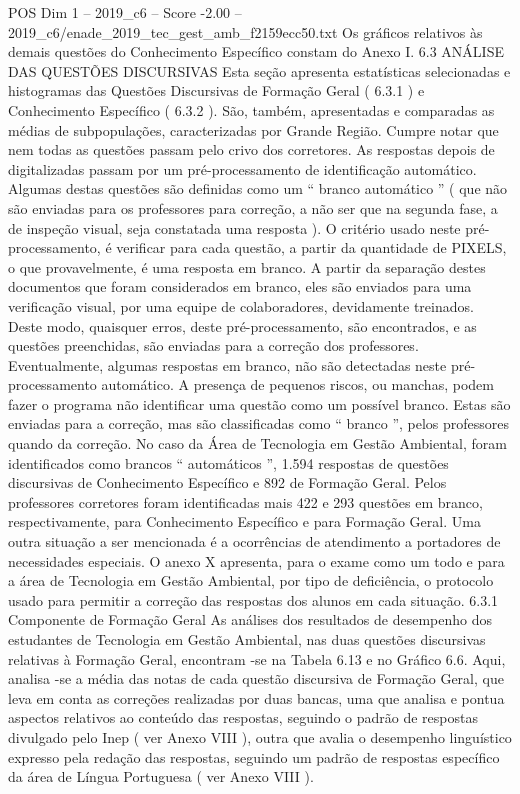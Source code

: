 \begin{textsample}{POS Dim 1 – 2019\_c6 – Score -2.00 – 2019\_c6/enade\_2019\_tec\_gest\_amb\_f2159ecc50.txt}
Os gráficos relativos às demais questões do Conhecimento Específico constam do Anexo I. 6.3 ANÁLISE DAS QUESTÕES DISCURSIVAS Esta seção apresenta estatísticas selecionadas e histogramas das Questões Discursivas de Formação Geral ( 6.3.1 ) e Conhecimento Específico ( 6.3.2 ).
São, também, apresentadas e comparadas as médias de subpopulações, caracterizadas por Grande Região.
Cumpre notar que nem todas as questões passam pelo crivo dos corretores.
As respostas depois de digitalizadas passam por um pré-processamento de identificação automático.
Algumas destas questões são definidas como um “ branco automático ” ( que não são enviadas para os professores para correção, a não ser que na segunda fase, a de inspeção visual, seja constatada uma resposta ).
O critério usado neste pré-processamento, é verificar para cada questão, a partir da quantidade de PIXELS, o que provavelmente, é uma resposta em branco.
A partir da separação destes documentos que foram considerados em branco, eles são enviados para uma verificação visual, por uma equipe de colaboradores, devidamente treinados.
Deste modo, quaisquer erros, deste pré-processamento, são encontrados, e as questões preenchidas, são enviadas para a correção dos professores.
Eventualmente, algumas respostas em branco, não são detectadas neste pré-processamento automático.
A presença de pequenos riscos, ou manchas, podem fazer o programa não identificar uma questão como um possível branco.
Estas são enviadas para a correção, mas são classificadas como “ branco ”, pelos professores quando da correção.
No caso da Área de Tecnologia em Gestão Ambiental, foram identificados como brancos “ automáticos ”, 1.594 respostas de questões discursivas de Conhecimento Específico e 892 de Formação Geral.
Pelos professores corretores foram identificadas mais 422 e 293 questões em branco, respectivamente, para Conhecimento Específico e para Formação Geral.
Uma outra situação a ser mencionada é a ocorrências de atendimento a portadores de necessidades especiais.
O anexo X apresenta, para o exame como um todo e para a área de Tecnologia em Gestão Ambiental, por tipo de deficiência, o protocolo usado para permitir a correção das respostas dos alunos em cada situação. 6.3.1 Componente de Formação Geral As análises dos resultados de desempenho dos estudantes de Tecnologia em Gestão Ambiental, nas duas questões discursivas relativas à Formação Geral, encontram -se na Tabela 6.13 e no Gráfico 6.6.
Aqui, analisa -se a média das notas de cada questão discursiva de Formação Geral, que leva em conta as correções realizadas por duas bancas, uma que analisa e pontua aspectos relativos ao conteúdo das respostas, seguindo o padrão de respostas divulgado pelo Inep ( ver Anexo VIII ), outra que avalia o desempenho linguístico expresso pela redação das respostas, seguindo um padrão de respostas específico da área de Língua Portuguesa ( ver Anexo VIII ).

\end{textsample}
